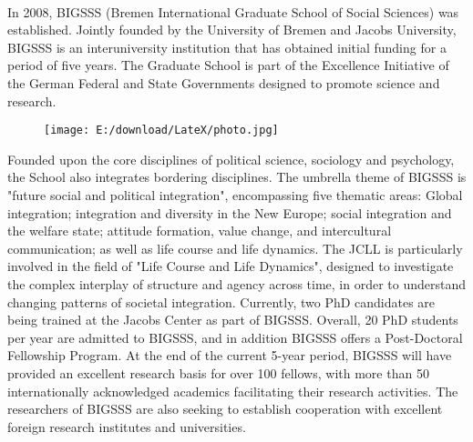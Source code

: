 \paragraph{}
In 2008, BIGSSS (Bremen International Graduate School of Social Sciences) was established. Jointly founded by the University of Bremen and Jacobs University, BIGSSS is an interuniversity institution that has obtained initial funding for a period of five years. The Graduate School is part of the Excellence Initiative of the German Federal and State Governments designed to promote science and research. 

\begin{figure}[htbp]
	\begin{center}
		\texttt{[image: E:/download/LateX/photo.jpg]}
	\end{center}
\end{figure}

Founded upon the core disciplines of political science, sociology and psychology, the School also integrates bordering disciplines. The umbrella theme of BIGSSS is "future social and political integration", encompassing five thematic areas: Global integration; integration and diversity in the New Europe; social integration and the welfare state; attitude formation, value change, and intercultural communication; as well as life course and life dynamics. The JCLL is particularly involved in the field of "Life Course and Life Dynamics", designed to investigate the complex interplay of structure and agency across time, in order to understand changing patterns of societal integration. Currently, two PhD candidates are being trained at the Jacobs Center as part of BIGSSS. Overall, 20 PhD students per year are admitted to BIGSSS, and in addition BIGSSS offers a Post-Doctoral Fellowship Program. At the end of the current 5-year period, BIGSSS will have provided an excellent research basis for over 100 fellows, with more than 50 internationally acknowledged academics facilitating their research activities.  The researchers of BIGSSS are also seeking to establish cooperation with excellent foreign research institutes and universities. 
